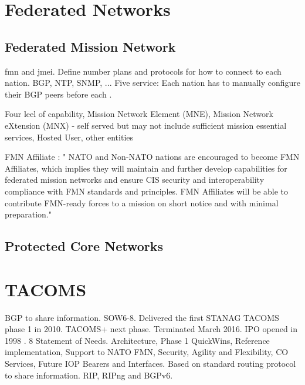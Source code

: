 \section{Federated Networks}
\subsection{Federated Mission Network}
\cite{http://www.act.nato.int/fmn}
\gls{fmn} and \gls{jmei}. Define number plans and protocols for how to connect to each nation. BGP, NTP, SNMP, ... Five service: Each nation has to manually configure their BGP peers before each . 

Four leel of capability, Mission Network Element (MNE), Mission Network eXtension (MNX) - self served but may not include sufficient mission essential services, Hosted User, other entities


FMN Affiliate : " NATO and Non-NATO nations are encouraged to become FMN Affiliates, which implies they will maintain and further develop capabilities for federated mission networks and ensure CIS security and interoperability compliance with FMN standards and principles. FMN Affiliates will be able to contribute FMN-ready forces to a mission on short notice and with minimal preparation."

\subsection{Protected Core Networks}
\section{TACOMS}

BGP to share information. SOW6-8. Delivered the first STANAG TACOMS phase 1 in 2010. TACOMS+ next phase. Terminated March 2016. IPO opened in 1998 \cite{tacoms.org}.  8 Statement of Needs. Architecture, Phase 1 QuickWins, Reference implementation, Support to NATO FMN, Security, Agility and Flexibility, CO Services, Future IOP Bearers and Interfaces. Based on standard routing protocol to share information. RIP, RIPng and BGPv6. 
